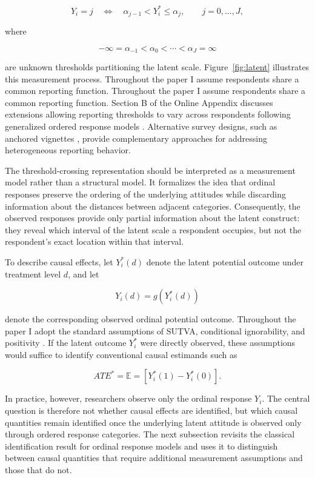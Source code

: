\documentclass{article}
\begin{document}
\[
Y_i=j \quad\Longleftrightarrow\quad \alpha_{j-1}<Y_i^\ast\le\alpha_j,
\qquad j=0,\ldots,J,
\]

where

\[
-\infty=\alpha_{-1}<\alpha_0<\cdots<\alpha_J=\infty
\]

are unknown thresholds partitioning the latent scale. Figure~\ref{fig:latent} illustrates this measurement process. Throughout the paper I assume respondents share a common reporting function. Throughout the paper I assume respondents share a common reporting function. Section B of the Online Appendix discusses extensions allowing reporting thresholds to vary across respondents following generalized ordered response models \citep{Williams2006a}. Alternative survey designs, such as anchored vignettes \citep{King2004a, King2007a}, provide complementary approaches for addressing heterogeneous reporting behavior.

The threshold-crossing representation should be interpreted as a measurement model rather than a structural model. It formalizes the idea that ordinal responses preserve the ordering of the underlying attitudes while discarding information about the distances between adjacent categories. Consequently, the observed responses provide only partial information about the latent construct: they reveal which interval of the latent scale a respondent occupies, but not the respondent’s exact location within that interval.

To describe causal effects, let $Y_i^\ast(d)$ denote the latent potential outcome under treatment level $d$, and let

\[
Y_i(d)=g\left(Y_i^\ast(d)\right)
\]

denote the corresponding observed ordinal potential outcome. Throughout the paper I adopt the standard assumptions of SUTVA, conditional ignorability, and positivity \citep{Rubin1974a}. If the latent outcome $Y_i^\ast$ were directly observed, these assumptions would suffice to identify conventional causal estimands such as

\[
ATE^\ast = \mathbb{E} = \left[ Y_i^\ast(1)-Y_i^\ast(0) \right].
\]

In practice, however, researchers observe only the ordinal response $Y_i$. The central question is therefore not whether causal effects are identified, but which causal quantities remain identified once the underlying latent attitude is observed only through ordered response categories. The next subsection revisits the classical identification result for ordinal response models and uses it to distinguish between causal quantities that require additional measurement assumptions and those that do not.
\end{document}
